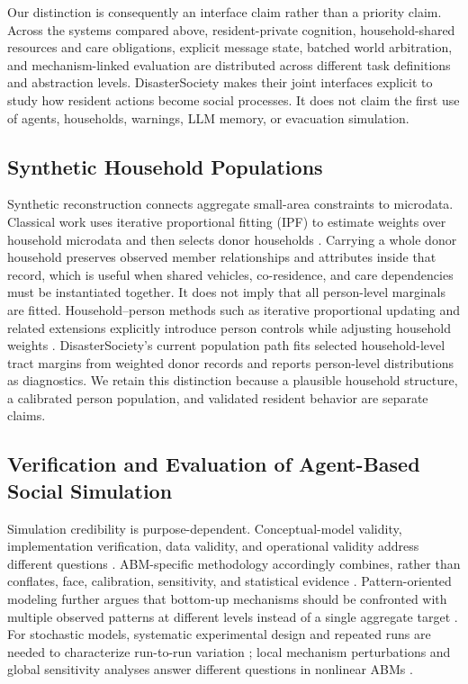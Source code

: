 \documentclass[journal]{IEEEtran}
\begin{document}
Our distinction is consequently an interface claim rather than a priority claim.
Across the systems compared above, resident-private cognition,
household-shared resources and care obligations, explicit message state,
batched world arbitration, and mechanism-linked evaluation are distributed
across different task definitions and abstraction levels. DisasterSociety makes
their joint interfaces explicit to study how resident actions become social
processes. It does not claim the first use of agents, households, warnings, LLM
memory, or evacuation simulation.

\subsection{Synthetic Household Populations}

Synthetic reconstruction connects aggregate small-area constraints to
microdata. Classical work uses iterative proportional fitting (IPF) to estimate
weights over household microdata and then selects donor households
\cite{beckman1996synthetic}. Carrying a whole donor household preserves observed
member relationships and attributes inside that record, which is useful when
shared vehicles, co-residence, and care dependencies must be instantiated
together. It does not imply that all person-level marginals are fitted.
Household--person methods such as iterative proportional updating and related
extensions explicitly introduce person controls while adjusting household
weights \cite{ye2009ipu,pritchard2012population,guo2007population}.
DisasterSociety's current population path fits selected household-level tract
margins from weighted donor records and reports person-level distributions as
diagnostics. We retain this distinction because a plausible household structure,
a calibrated person population, and validated resident behavior are separate
claims.

\subsection{Verification and Evaluation of Agent-Based Social Simulation}

Simulation credibility is purpose-dependent. Conceptual-model validity,
implementation verification, data validity, and operational validity address
different questions \cite{sargent2013verification}. ABM-specific methodology
accordingly combines, rather than conflates, face, calibration, sensitivity, and
statistical evidence \cite{klugl2008validation}. Pattern-oriented modeling
further argues that bottom-up mechanisms should be confronted with multiple
observed patterns at different levels instead of a single aggregate target
\cite{grimm2005pattern}. For stochastic models, systematic experimental design
and repeated runs are needed to characterize run-to-run variation
\cite{lorscheid2012blackbox}; local mechanism perturbations and global
sensitivity analyses answer different questions in nonlinear ABMs
\cite{tenbroeke2016sensitivity}.
\end{document}
